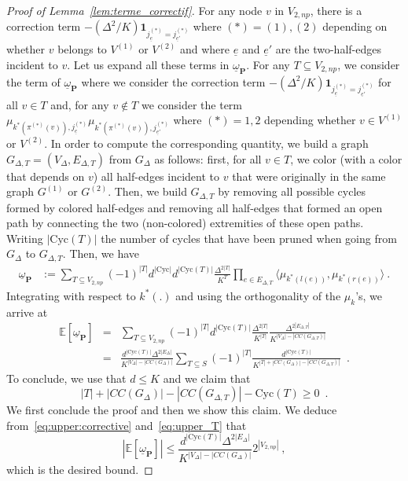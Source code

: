 \documentclass[10pt,a4paper]{amsart}
\begin{document}
    \begin{proof}[Proof of Lemma~\ref{lem:terme_correctif}]
    For any node $v$ in $V_{2,np}$, there is a correction term $-(\Delta^2/K) \mathbf{1}_{j^{(*)}_{\underline{e}}= j^{(*)}_{\underline{e}'}}$ where $(*)=(1),(2)$ depending on whether $v$ belongs to $V^{(1)}$ or $V^{(2)}$ and where $\underline{e}$ and $\underline{e}'$ are the two-half-edges incident to $v$. 
    Let us expand all these terms in $\underline{\omega}_{\mathbf{P}}$. For any $T\subseteq V_{2,np}$, we consider the term of $\underline{\omega}_{\mathbf{P}}$ where we consider the correction term 
    $-(\Delta^2/K) \mathbf{1}_{j^{(*)}_{\underline{e}}= j^{(*)}_{\underline{e}'}}$ for all $v\in T$ and, for any $v\notin T$ we consider the term 
    $\mu_{k^{*}(\pi^{(*)}(v)),j^{(*)}_{\underline{e}}} \mu_{k^{*}(\pi^{(*)}(v)),j^{(*)}_{\underline{e}'}}$ where $(*)=1,2$ depending whether $v\in V^{(1)}$ or $V^{(2)}$. In order to compute the corresponding quantity, we build a graph $G_{\Delta,T}=(V_{\Delta},E_{\Delta,T})$ from $G_{\Delta}$ as follows: first, for all $v\in T$, we color (with a color that depends on $v$) all half-edges incident to $v$ that were originally in the same graph $G^{(1)}$ or $G^{(2)}$. Then, we build $G_{\Delta,T}$ by removing all possible cycles formed by colored half-edges and removing all half-edges that formed an open path by connecting the two (non-colored) extremities of these open paths. Writing $|\mathrm{Cyc}(T)|$ the number of cycles that have been pruned when going from $G_{\Delta}$ to $G_{\Delta,T}$. Then, we have 
    \begin{eqnarray*}
        \underline{\omega}_{\mathbf{P}} &:= \sum_{T\subseteq V_{2,np}} (-1)^{|T|} d^{|\mathrm{Cyc}|} d^{|\mathrm{Cyc}(T)|} \frac{\Delta^{2|T|}}{K^{T}}\prod_{e\in E_{\Delta,T}} \langle \mu_{k^*(l(e))},  \mu_{k^*(r(e))}\rangle\ .
    \end{eqnarray*}
    Integrating with respect to $k^*(.)$ and using the orthogonality  of the $\mu_k$'s, we arrive at 
    \begin{eqnarray}\nonumber
    \mathbb{E}\left[\underline{\omega}_{\mathbf{P}}\right]&=& \sum_{T\subseteq V_{2,np}} (-1)^{|T|}  d^{|\mathrm{Cyc}(T)|} \frac{\Delta^{2|T|}}{K^{|T|}} \frac{\Delta^{2|E_{\Delta,T}|}}{K^{|V_{\Delta}|-|CC(G_{\Delta,T})|}} \\
    & = &   \frac{d^{|\mathrm{Cyc}(T)|} \Delta^{2|E_{\Delta}|}}{K^{|V_{\Delta}|-|CC(G_{\Delta})|}}\sum_{T\subseteq S} (-1)^{|T|}  \frac{d^{|\mathrm{Cyc}(T)|}}{K^{|T|+|CC(G_{\Delta})| -|CC(G_{\Delta,T})|}} \enspace . \label{eq:upper:corrective}
    \end{eqnarray}
    To conclude, we use that $d\leq K$ and we claim that  
    \begin{equation}\label{eq:upper_T}
    |T|+ |CC(G_{\Delta})| -|CC(G_{\Delta,T})|- \mathrm{Cyc}(T)\geq 0\enspace . 
    \end{equation}
    We first conclude the proof and then we show this claim. We deduce from~\eqref{eq:upper:corrective} and~\eqref{eq:upper_T} that 
    \[
    \left|\mathbb{E}\left[\underline{\omega}_{\mathbf{P}}\right]\right|\leq \frac{d^{|\mathrm{Cyc}(T)|} \Delta^{2|E_{\Delta}|}}{K^{|V_{\Delta}|-|CC(G_{\Delta})|}} 2^{|V_{2,np}|}\ , 
    \]
    which is the desired bound. 
    

\end{proof}
\end{document}
